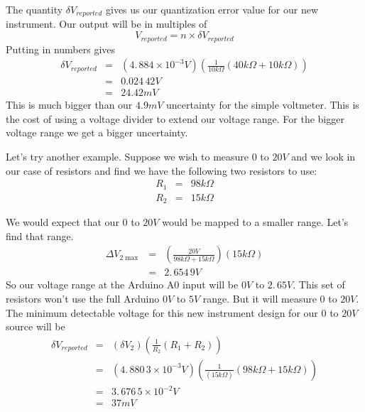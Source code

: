 The quantity $\delta V_{reported}$ gives us our quantization error value for
our new instrument. Our output will be in multiples of 
\begin{equation*}
V_{reported}=n\times \delta V_{reported}
\end{equation*}%
Putting in numbers gives 
\begin{eqnarray*}
\delta V_{reported} &=&\left( 4.\,\allowbreak 884\times 10^{-3}\unit{V}%
\right) \left( \frac{1}{10\unit{k%
\Omega%
}}\left( 40\unit{k%
\Omega%
}+10\unit{k%
\Omega%
}\right) \right) \\
&=&0.024\,42\unit{V} \\
&=&24.42\unit{mV}
\end{eqnarray*}%
This is much bigger than our $4.9\unit{mV}$ uncertainty for the simple
voltmeter. This is the cost of using a voltage divider to extend our
voltage range. For the bigger voltage range we get a bigger uncertainty.

Let's try another example. Suppose we wish to measure $0$ to $20\unit{V}$
and we look in our case of resistors and find we have the following two
resistors to use:%
\begin{eqnarray*}
R_{1} &=&98\unit{k%
\Omega%
} \\
R_{2} &=&15\unit{k%
\Omega%
}
\end{eqnarray*}

We would expect that our $0$ to $20\unit{V}$ would be mapped to a smaller
range. Let's find that range.%
\begin{eqnarray*}
\Delta V_{2\max } &=&\left( \frac{20\unit{V}}{98\unit{k%
\Omega%
}+15\unit{k%
\Omega%
}}\right) \left( 15\unit{k%
\Omega%
}\right) \\
&=&2.\,\allowbreak 654\,9\unit{V}
\end{eqnarray*}%
So our voltage range at the Arduino A0 input will be $0\unit{V}$ to $%
2.\,\allowbreak 65\unit{V}.$ This set of resistors won't use the full
Arduino $0\unit{V}$ to $5\unit{V}$ range. But it will measure $0$ to $20%
\unit{V}.$ The minimum detectable voltage for this new instrument design for
our $0$ to $20\unit{V}$ source will be 
\begin{eqnarray*}
\delta V_{reported} &=&\left( \delta V_{2}\right) \left( \frac{1}{R_{2}}%
\left( R_{1}+R_{2}\right) \right) \\
&=&\left( 4.\,\allowbreak 880\,3\times 10^{-3}\unit{V}\right) \left( \frac{1%
}{\left( 15\unit{k%
\Omega%
}\right) }\left( 98\unit{k%
\Omega%
}+15\unit{k%
\Omega%
}\right) \right) \\
&=&3.\,\allowbreak 676\,5\times 10^{-2}\unit{V} \\
&=&37\unit{mV}
\end{eqnarray*}

